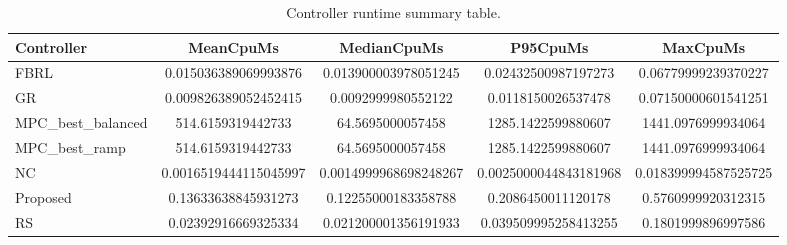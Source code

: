 \begin{table}[t]
\centering
\caption{Controller runtime summary table.}
\label{tab:runtime_auto}
\begin{tabular}{lcccc}
\toprule
Controller & MeanCpuMs & MedianCpuMs & P95CpuMs & MaxCpuMs \\
\midrule
FBRL & 0.015036389069993876 & 0.013900003978051245 & 0.02432500987197273 & 0.06779999239370227 \\
GR & 0.009826389052452415 & 0.0092999980552122 & 0.0118150026537478 & 0.07150000601541251 \\
MPC\_best\_balanced & 514.6159319442733 & 64.5695000057458 & 1285.1422599880607 & 1441.0976999934064 \\
MPC\_best\_ramp & 514.6159319442733 & 64.5695000057458 & 1285.1422599880607 & 1441.0976999934064 \\
NC & 0.0016519444115045997 & 0.0014999968698248267 & 0.0025000044843181968 & 0.018399994587525725 \\
Proposed & 0.13633638845931273 & 0.12255000183358788 & 0.2086450011120178 & 0.5760999920312315 \\
RS & 0.02392916669325334 & 0.021200001356191933 & 0.039509995258413255 & 0.1801999896997586 \\
\bottomrule
\end{tabular}
\end{table}